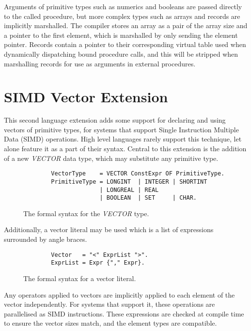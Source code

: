 \documentclass[a4paper,11pt]{article}
\begin{document}
    \noindent
    Arguments of primitive types such as numerics and booleans are passed directly to the called procedure, but more complex types such as arrays and records are implicitly marshalled. The compiler stores an array as a pair of the array size and a pointer to the first element, which is marshalled by only sending the element pointer. Records contain a pointer to their corresponding virtual table used when dynamically dispatching bound procedure calls, and this will be stripped when marshalling records for use as arguments in external procedures.

    \section{SIMD Vector Extension}
    This second language extension adds some support for declaring and using vectors of primitive types, for systems that support Single Instruction Multiple Data (SIMD) operations. High level languages rarely support this technique, let alone feature it as a part of their syntax. Central to this extension is the addition of a new \emph{VECTOR} data type, which may substitute any primitive type.

    \begin{figure}[h]
    \begin{lstlisting}
        VectorType    = VECTOR ConstExpr OF PrimitiveType.
        PrimitiveType = LONGINT  | INTEGER | SHORTINT
                      | LONGREAL | REAL 
                      | BOOLEAN  | SET     | CHAR.
    \end{lstlisting}
    \caption{The formal syntax for the \emph{VECTOR} type.}
    \end{figure}

    \noindent
    Additionally, a vector literal may be used which is a list of expressions surrounded by angle braces.

    \begin{figure}[h]
    \begin{lstlisting}
        Vector   = "<" ExprList ">".
        ExprList = Expr {"," Expr}.
    \end{lstlisting}
    \caption{The formal syntax for a vector literal.}
    \end{figure}

    \noindent
    Any operators applied to vectors are implicitly applied to each element of the vector independently. For systems that support it, these operations are parallelised as SIMD instructions. These expressions are checked at compile time to ensure the vector sizes match, and the element types are compatible.
\end{document}
